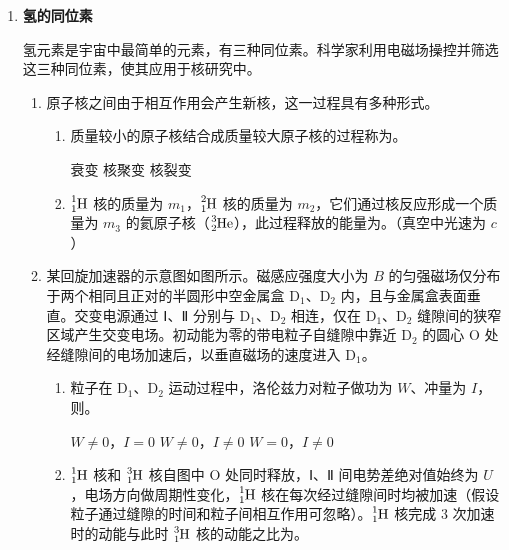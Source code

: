 \documentclass[\gkver]{gaokaozhenti}
\begin{document}
\begin{enumerate}
{彗星在运动过程中满足机械能守恒，有

$\frac{1}{2}mv_{1}^{2} - \frac{GMm}{r_{1}} = \frac{1}{2}mv_{2}^{2} - \frac{GMm}{r_{2}}$

得　$v_{2} = \sqrt{v_{1}^{2} + \frac{2GM}{r_{2}} - \frac{2GM}{r_{1}}}$
}

\item
\textbf{氢的同位素}

氢元素是宇宙中最简单的元素，有三种同位素。科学家利用电磁场操控并筛选这三种同位素，使其应用于核研究中。
\begin{enumerate}
	\item
	原子核之间由于相互作用会产生新核，这一过程具有多种形式。
	\begin{enumerate}
		\item
		质量较小的原子核结合成质量较大原子核的过程称为。

		{衰变}
		{核聚变}
		{核裂变}

		\item
		$\ce{^{1}_{1}H}$ 核的质量为 $m_{1}$，$\ce{^{2}_{1}H}$ 核的质量为 $m_{2}$，它们通过核反应形成一个质量为 $m_{3}$ 的氦原子核（$\ce{^{3}_{2}He}$），此过程释放的能量为。（真空中光速为 $c$）
	\end{enumerate}

	\item
	某回旋加速器的示意图如图所示。磁感应强度大小为 $B$ 的匀强磁场仅分布于两个相同且正对的半圆形中空金属盒 D$_{1}$、D$_{2}$ 内，且与金属盒表面垂直。交变电源通过 Ⅰ、Ⅱ 分别与 D$_{1}$、D$_{2}$ 相连，仅在 D$_{1}$、D$_{2}$ 缝隙间的狭窄区域产生交变电场。初动能为零的带电粒子自缝隙中靠近 D$_{2}$ 的圆心 O 处经缝隙间的电场加速后，以垂直磁场的速度进入 D$_{1}$。

	\onepicture[h=3.0cm, align=right]{}
	\begin{enumerate}
		\item
		粒子在 D$_{1}$、D$_{2}$ 运动过程中，洛伦兹力对粒子做功为 $W$、冲量为 $I$，则。

		{$W \neq 0$，$I = 0$}
		{$W \neq 0$，$I \neq 0$}
		{$W = 0$，$I \neq 0$}

		\item
		$\ce{^{1}_{1}H}$ 核和 $\ce{^{3}_{1}H}$ 核自图中 O 处同时释放，Ⅰ、Ⅱ 间电势差绝对值始终为 $U$，电场方向做周期性变化，$\ce{^{1}_{1}H}$ 核在每次经过缝隙间时均被加速（假设粒子通过缝隙的时间和粒子间相互作用可忽略）。$\ce{^{1}_{1}H}$ 核完成 3 次加速时的动能与此时 $\ce{^{3}_{1}H}$ 核的动能之比为。


\end{enumerate}
\end{enumerate}
\end{enumerate}
\end{document}
